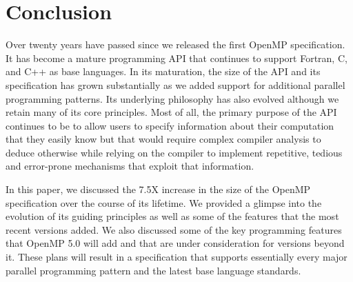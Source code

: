 \section{Conclusion}
\label{sec:conclusion}

Over twenty years have passed since we released the first OpenMP 
specification. It has become a mature programming API that 
continues to support Fortran, C, and C++ as base languages. In its
maturation, the size of the API and its specification has grown 
substantially as we added support for additional parallel programming
patterns. Its underlying philosophy has also evolved although we 
retain many of its core principles. Most of all, the primary purpose 
of the API continues to be to allow users to specify information about
their computation that they easily know but that would require complex
compiler analysis to deduce otherwise while relying on the compiler
to implement repetitive, tedious and error-prone mechanisms that
exploit that information.

In this paper, we discussed the 7.5X increase in the size of the 
OpenMP specification over the course of its lifetime. We provided 
a glimpse into the evolution of its guiding principles as well as
some of the features that the most recent versions added. We also
discussed some of the key programming features that OpenMP 5.0 will
add and that are under consideration for versions beyond it. These
plans will result in a specification that supports essentially every 
major parallel programming pattern and the latest base language standards.


